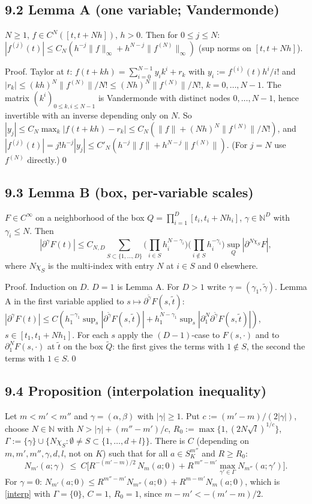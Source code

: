 \documentclass[11pt]{article}
\newcommand{\N}{\mathbb{N}}
\begin{document}
\subsection*{9.2 Lemma A (one variable; Vandermonde)}
$N\ge1$, $f\in C^N([t,t+Nh])$, $h>0$. Then for $0\le j\le N$: $|f^{(j)}(t)|\le C_N(h^{-j}\|f\|_\infty+h^{N-j}\|f^{(N)}\|_\infty)$ (sup norms on $[t,t+Nh]$).

\noindent Proof. Taylor at $t$: $f(t+kh)=\sum_{i=0}^{N-1}y_ik^i+r_k$ with $y_i:=f^{(i)}(t)h^i/i!$ and $|r_k|\le(kh)^N\|f^{(N)}\|/N!\le(Nh)^N\|f^{(N)}\|/N!$, $k=0,\dots,N-1$. The matrix $(k^i)_{0\le k,i\le N-1}$ is Vandermonde with distinct nodes $0,\dots,N-1$, hence invertible with an inverse depending only on $N$. So $|y_j|\le C_N\max_k|f(t+kh)-r_k|\le C_N(\|f\|+(Nh)^N\|f^{(N)}\|/N!)$, and $|f^{(j)}(t)|=j!h^{-j}|y_j|\le C'_N(h^{-j}\|f\|+h^{N-j}\|f^{(N)}\|)$. (For $j=N$ use $f^{(N)}$ directly.)\qed

\subsection*{9.3 Lemma B (box, per-variable scales)}
$F\in C^\infty$ on a neighborhood of the box $Q=\prod_{i=1}^D[t_i,t_i+Nh_i]$, $\gamma\in\N^D$ with $\gamma_i\le N$. Then
\[
|\partial^\gamma F(t)|\le C_{N,D}\sum_{S\subset\{1,\dots,D\}}\Big(\prod_{i\in S}h_i^{N-\gamma_i}\Big)\Big(\prod_{i\notin S}h_i^{-\gamma_i}\Big)\sup_Q|\partial^{N\chi_S}F|,
\]
where $N\chi_S$ is the multi-index with entry $N$ at $i\in S$ and $0$ elsewhere.

\noindent Proof. Induction on $D$. $D=1$ is Lemma A. For $D>1$ write $\gamma=(\gamma_1,\tilde\gamma)$. Lemma A in the first variable applied to $s\mapsto\partial^{\tilde\gamma}F(s,\tilde t)$: $|\partial^\gamma F(t)|\le C(h_1^{-\gamma_1}\sup_s|\partial^{\tilde\gamma}F(s,\tilde t)|+h_1^{N-\gamma_1}\sup_s|\partial_1^N\partial^{\tilde\gamma}F(s,\tilde t)|)$, $s\in[t_1,t_1+Nh_1]$. For each $s$ apply the $(D-1)$-case to $F(s,\cdot)$ and to $\partial_1^NF(s,\cdot)$ at $\tilde t$ on the box $\tilde Q$: the first gives the terms with $1\notin S$, the second the terms with $1\in S$.\qed

\subsection*{9.4 Proposition (interpolation inequality)}
Let $m<m'<m''$ and $\gamma=(\alpha,\beta)$ with $|\gamma|\ge1$. Put $c:=(m'-m)/(2|\gamma|)$, choose $N\in\N$ with $N>|\gamma|+(m''-m')/c$, $R_0:=\max\{1,(2N\sqrt l)^{1/c}\}$, $\Gamma:=\{\gamma\}\cup\{N\chi_S:\emptyset\ne S\subset\{1,\dots,d+l\}\}$. There is $C$ (depending on $m,m',m'',\gamma,d,l$, not on $K$) such that for all $a\in S^{m''}_K$ and $R\ge R_0$:
\begin{equation}\label{interp}
N_{m'}(a;\gamma)\ \le\ C\Big[R^{-(m'-m)/2}\,N_m(a;0)+R^{\,m''-m'}\max_{\gamma'\in\Gamma}N_{m''}(a;\gamma')\Big].
\end{equation}
For $\gamma=0$: $N_{m'}(a;0)\le R^{m''-m'}N_{m''}(a;0)+R^{m-m'}N_m(a;0)$, which is \eqref{interp} with $\Gamma=\{0\}$, $C=1$, $R_0=1$, since $m-m'<-(m'-m)/2$.
\end{document}
